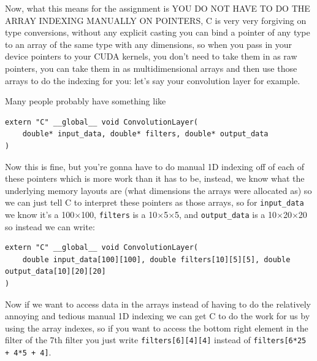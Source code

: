 Now, what this means for the assignment is YOU DO NOT HAVE TO DO THE ARRAY INDEXING MANUALLY ON POINTERS, C is very very forgiving on type conversions, without any explicit casting you can bind a pointer of any type to an array of the same type with any dimensions, so when you pass in your device pointers to your CUDA kernels, you don't need to take them in as raw pointers, you can take them in as multidimensional arrays and then use those arrays to do the indexing for you: let's say your convolution layer for example.

Many people probably have something like

\begin{verbatim}
extern "C" __global__ void ConvolutionLayer(
    double* input_data, double* filters, double* output_data
)
\end{verbatim}

Now this is fine, but you're gonna have to do manual 1D indexing off of each of these pointers which is more work than it has to be, instead, we know what the underlying memory layouts are (what dimensions the arrays were allocated as) so we can just tell C to interpret these pointers as those arrays, so for \texttt{input\_data} we know it's a 100$\times$100, \texttt{filters} is a 10$\times$5$\times$5, and \texttt{output\_data} is a 10$\times$20$\times$20 so instead we can write:

\begin{verbatim}
extern "C" __global__ void ConvolutionLayer(
    double input_data[100][100], double filters[10][5][5], double output_data[10][20][20]
)
\end{verbatim}

Now if we want to access data in the arrays instead of having to do the relatively annoying and tedious manual 1D indexing we can get C to do the work for us by using the array indexes, so if you want to access the bottom right element in the filter of the 7th filter you just write \texttt{filters[6][4][4]}
instead of
\texttt{filters[6*25 + 4*5 + 4]}.



